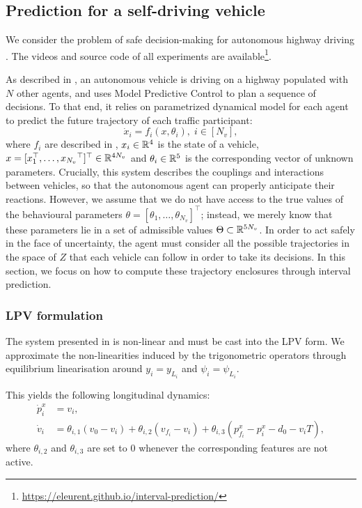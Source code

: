 \subsection{Prediction for a self-driving vehicle}
\label{sec:Examples}
We consider the problem of safe decision-making for autonomous highway driving \citep{highway-env}. The videos and source code of all experiments are available\footnote{\href{https://eleurent.github.io/interval-prediction/}{https://eleurent.github.io/interval-prediction/}}.

As described in , an autonomous vehicle is driving on a highway populated with $N$ other agents, and uses Model Predictive Control to plan a sequence of decisions. To that end, it relies on parametrized dynamical model for each agent to predict the future trajectory of each traffic participant: $$\dot{x}_i=f_i(x,\theta_i),\;i\in[N_v],$$ where $f_i$ are described in , $x_i\in\mathbb{R}^4$ is the state of a vehicle, $x = [x_1^\top,\dots,{x_{N_v}}^\top]^\top\in\mathbb{R}^{4N_v}$ and $\theta_i\in\mathbb{R}^5$ is the corresponding vector of unknown parameters. Crucially, this system describes the couplings and interactions between vehicles, so that the autonomous agent can properly anticipate their reactions. 
However, we assume that we do not have access to the true values of the behavioural parameters $\theta=[\theta_1,\dots,\theta_{N_v}]^\top$; instead, we merely know that these parameters lie in a set of admissible values $\Theta\subset\mathbb{R}^{5N_v}$. In order to act safely in the face of uncertainty, the agent must consider all the possible trajectories in the space of $Z$ that each vehicle can follow in order to take its decisions. In this section, we focus on how to compute these trajectory enclosures through interval prediction.

\subsubsection{\gls{LPV} formulation}

The system presented in  is non-linear and must be cast into the \gls{LPV} form. We approximate the non-linearities induced by the trigonometric operators through equilibrium linearisation around $y_i=y_{L_i}$ and $\psi_i=\psi_{L_i}$.

This yields the following longitudinal dynamics:
\begin{align*}
\dot{p}^x_i &= v_i,\\
\dot v_i &= \theta_{i,1} (v_0 - v_i) + \theta_{i,2} (v_{f_i} - v_i) + \theta_{i,3}(p^x_{f_i} - p^x_i - d_0 - v_i T),
\end{align*}
where $\theta_{i,2}$ and $\theta_{i,3}$ are set to $0$ whenever the corresponding features are not active.

